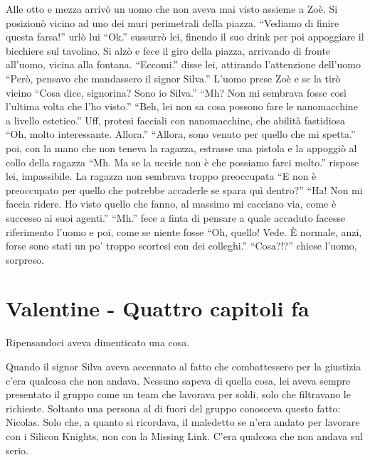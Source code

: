     Alle otto e mezza arrivò un uomo che non aveva mai visto assieme a Zoè. Si posizionò vicino ad uno dei muri
    perimetrali della
    piazza. ``Vediamo di finire questa farsa!'' urlò lui ``Ok.'' sussurrò lei, finendo il suo drink per poi appoggiare
    il bicchiere sul tavolino. Si alzò e fece il giro della piazza, arrivando di fronte all'uomo, vicina alla fontana. ``Eccomi.'' disse lei,
    attirando l'attenzione dell'uomo ``Però, pensavo che mandassero il signor Silva.'' L'uomo prese Zoè e se la tirò
    vicino ``Cosa dice, signorina? Sono io Silva.'' ``Mh? Non mi sembrava fosse così l'ultima volta che l'ho visto.''
    ``Beh, lei non sa cosa possono fare le nanomacchine a livello estetico.'' Uff, protesi facciali con nanomacchine,
    che abilità fastidiosa ``Oh, molto interessante. Allora.'' ``Allora, sono venuto per quello che mi spetta.'' poi,
    con la mano che non teneva la ragazza, estrasse una pistola e la appoggiò al collo della ragazza ``Mh. Ma se la
    uccide non è che possiamo farci molto.'' rispose lei, impassibile. La ragazza non sembrava troppo preoccupata ``E
    non è preoccupato per quello che potrebbe accaderle se spara quì dentro?'' ``Ha! Non mi faccia ridere. Ho visto
    quello che fanno, al massimo mi cacciano via, come è successo ai suoi agenti.'' ``Mh.'' fece a finta di pensare a
    quale accaduto facesse riferimento l'uomo e poi, come se niente fosse ``Oh, quello! Vede. È normale, anzi, forse
    sono stati un po' troppo scortesi con dei colleghi.'' ``Cosa?!?'' chiese l'uomo, sorpreso.

  \section*{Valentine - Quattro capitoli fa}

    Ripensandoci aveva dimenticato una cosa.

    Quando il signor Silva aveva accennato al fatto che combattessero per la giustizia c'era qualcosa che non andava.
    Nessuno sapeva di quella cosa, lei aveva sempre presentato il gruppo come un team che lavorava per soldi, solo che
    filtravano le richieste. Soltanto una persona al di fuori del gruppo conosceva questo fatto: Nicolas. Solo che, a
    quanto si ricordava, il maledetto se n'era andato per lavorare con i Silicon Knights, non con la Missing Link. C'era
    qualcosa che non andava sul serio.


